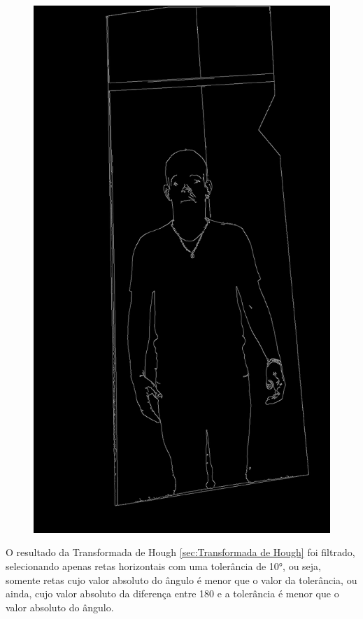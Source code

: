 \begin{figure}[htb]
\begin{minipage}{0.45\textwidth}
            \includegraphics[width=\textwidth]{figuras/filter/canny/canny.png}
        \end{minipage}
    \label{fig:maskCanny}
\end{figure}

O resultado da Transformada de Hough \ref{sec:Transformada de Hough} foi filtrado, selecionando apenas retas horizontais com uma tolerância de 10°, ou seja, somente retas cujo valor absoluto do ângulo é menor que o valor da tolerância, ou ainda, cujo valor absoluto da diferença entre 180 e a tolerância é menor que o valor absoluto do ângulo.

